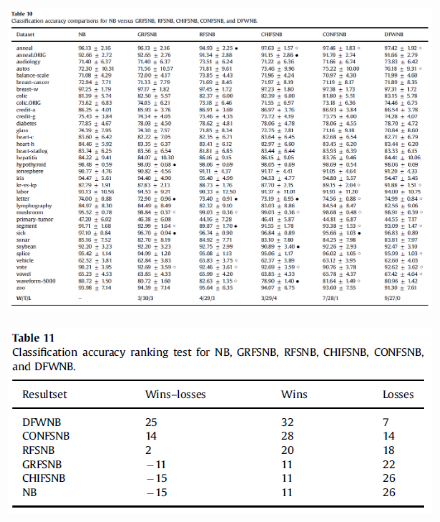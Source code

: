 \documentclass[12pt, a4paper]{article}
\begin{document}
\begin{figure}
    \centering
    \includegraphics[width=\linewidth]{images/article1/table10.png}
    \caption{}
    \label{a1_table10}
\end{figure}
\begin{figure}
    \centering
    \includegraphics[width=\linewidth]{images/article1/table11.png}
    \caption{}
    \label{a1_table11}
\end{figure}

\clearpage
\end{document}
